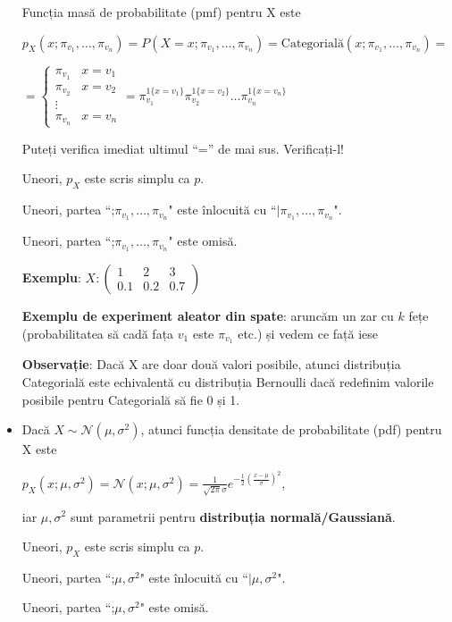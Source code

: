 \documentclass[12pt]{article}
\begin{document}
\begin{itemize}
		Funcția masă de probabilitate (pmf) pentru X este 
		
		$p_X(x;\pi_{v_1},\dots,\pi_{v_n}) = P(X = x;\pi_{v_1},\dots,\pi_{v_n}) = \text{Categorială}(x;\pi_{v_1},\dots,\pi_{v_n}) =$
		
		$=\begin{cases}
		\pi_{v_1} & x = v_1\\
		\pi_{v_2} & x = v_2 \\
		\vdots\\
		\pi_{v_n} & x = v_n
		\end{cases}=\pi_{v_1}^{1\{x=v_1\}} \pi_{v_2}^{1\{x=v_2\}} \dots \pi_{v_n}^{1\{x=v_n\}}$
		
		Puteți verifica imediat ultimul ``='' de mai sus. Verificați-l!
		
		Uneori, $p_X$ este scris simplu ca $p$. 
		
		Uneori, partea ``;$\pi_{v_1},\dots,\pi_{v_n}$" este înlocuită cu ``$|\pi_{v_1},\dots,\pi_{v_n}$".
		
		Uneori, partea ``;$\pi_{v_1},\dots,\pi_{v_n}$" este omisă.
		
		\textbf{Exemplu}: $X: \begin{pmatrix}
		1 & 2 & 3\\
		0.1 & 0.2 & 0.7
		\end{pmatrix}$
		
		\textbf{Exemplu de experiment aleator din spate}: aruncăm un zar cu $k$ fețe (probabilitatea să cadă fața $v_1$ este $\pi_{v_1}$ etc.) și vedem ce față iese
		
		\textbf{Observație}: Dacă X are doar două valori posibile, atunci distribuția Categorială este echivalentă cu distribuția Bernoulli dacă redefinim valorile posibile pentru Categorială să fie 0 și 1.
			
		\item Dacă $X \sim \mathcal{N}(\mu,\sigma^2)$, atunci funcția densitate de probabilitate (pdf) pentru X este
		
		$p_X(x;\mu,\sigma^2) = \mathcal{N}(x;\mu,\sigma^2) = \frac{1}{\sqrt{2\pi}\sigma} e^{-\frac{1}{2} (\frac{x-\mu}{\sigma})^2}$,
		
		iar $\mu,\sigma^2$ sunt parametrii pentru \textbf{distribuția normală/Gaussiană}. 
		
		Uneori, $p_X$ este scris simplu ca $p$. 
		
		Uneori, partea ``;$\mu,\sigma^2$" este înlocuită cu ``$|\mu,\sigma^2$".
		
		Uneori, partea ``;$\mu,\sigma^2$" este omisă. 
		

\end{itemize}
\end{document}

